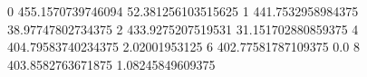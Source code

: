 0 455.1570739746094 52.381256103515625
1 441.7532958984375 38.97747802734375
2 433.9275207519531 31.151702880859375
4 404.79583740234375 2.02001953125
6 402.77581787109375 0.0
8 403.8582763671875 1.08245849609375
